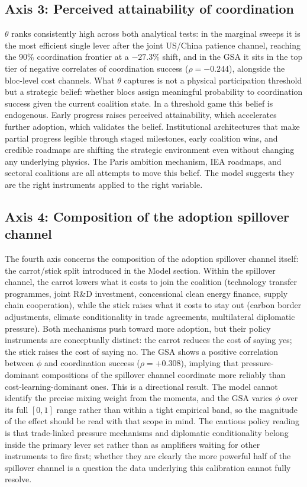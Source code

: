 \documentclass[10pt,a4paper]{article}
\begin{document}
\subsection{Axis 3: Perceived attainability of coordination}

$\theta$ ranks consistently high across both analytical tests: in the marginal sweeps it is the most
efficient single lever after the joint US/China patience channel, reaching the 90\% coordination
frontier at a $-27.3\%$ shift, and in the GSA it sits in the top tier of negative correlates of
coordination success ($\rho = -0.244$), alongside the bloc-level cost channels. What $\theta$ captures
is not a physical participation threshold but a strategic belief: whether blocs assign meaningful
probability to coordination success given the current coalition state. In a threshold
game this belief is endogenous. Early progress raises perceived attainability, which accelerates further
adoption, which validates the belief. Institutional architectures that make partial progress legible through
staged milestones, early coalition wins, and credible roadmaps are shifting the strategic environment even
without changing any underlying physics. The Paris ambition mechanism, IEA roadmaps, and sectoral
coalitions are all attempts to move this belief. The model suggests they are the right instruments applied
to the right variable.

\needspace{6em}
\subsection{Axis 4: Composition of the adoption spillover channel}

The fourth axis concerns the composition of the adoption spillover channel itself: the carrot/stick split
introduced in the Model section. Within the spillover channel, the carrot lowers what it costs to join the
coalition (technology transfer programmes, joint R\&D investment, concessional clean energy finance,
supply chain cooperation), while the stick raises what it costs to stay out (carbon border adjustments,
climate conditionality in trade agreements, multilateral diplomatic pressure). Both mechanisms push toward
more adoption, but their policy instruments are conceptually distinct: the carrot reduces the cost of
saying yes; the stick raises the cost of saying no. The GSA shows a positive correlation between $\phi$
and coordination success ($\rho = +0.308$), implying that pressure-dominant compositions of the spillover
channel coordinate more reliably than cost-learning-dominant ones. This is a directional result. The model
cannot identify the precise mixing weight from the moments, and the GSA varies $\phi$ over its full
$[0, 1]$ range rather than within a tight empirical band, so the magnitude of the effect should be read with
that scope in mind. The cautious policy reading is that trade-linked pressure mechanisms and diplomatic
conditionality belong inside the primary lever set rather than as amplifiers waiting for other instruments
to fire first; whether they are clearly the more powerful half of the spillover channel is a question the
data underlying this calibration cannot fully resolve.
\end{document}

